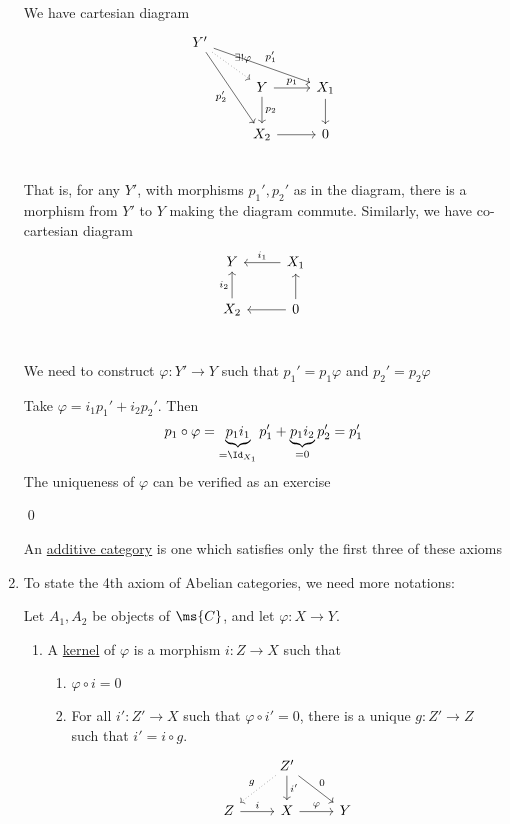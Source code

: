 \documentclass[x11names,reqno,14pt]{extarticle}
\begin{document}
\begin{enumerate}
\lem
 We have cartesian diagram 
\[
\begin{tikzcd}
Y'\ar[dr, dotted, "\exists!\varphi"]\ar[drr, "p_1'"]\ar[ddr, "p_2'"'] &  &  \\
& Y \ar[r, "p_1"] \ar[d, "p_2"] & X_1 \ar[d] \\
& X_2 \ar[r] & 0  \\
\end{tikzcd}
\]
That is, for any $Y'$, with morphisms $p_1', p_2'$ as in the diagram, there is a morphism from $Y'$ to $Y$ making the diagram commute. Similarly, we have co-cartesian diagram
\[
\begin{tikzcd}
Y & \ar[l, "i_1"'] X_1 \\
X_2 \ar[u, "i_2"] & 0 \ar[l] \ar[u] \\
\end{tikzcd}
\]

\proof 

We need to construct $\varphi:Y'\to Y$ such that $p_1' = p_1\varphi$ and $p_2'=p_2\varphi$

Take $\varphi = i_1p_1' + i_2p_2'$. Then 
\[
p_1\circ\varphi = \underbrace{p_1i_1}_{=\Id_{X_1}}p_1' + \underbrace{p_1i_2}_{=0}p_2' = p_1'
\]
The uniqueness of $\varphi$ can be verified as an exercise

\qed


An \underline{additive category} is one which satisfies only the first three of these axioms

\item To state the 4th axiom of Abelian categories, we need more notations:

 Let $A_1,A_2$ be objects of $\ms{C}$, and let $\varphi:X\to Y$.

\begin{enumerate}
\item A \underline{kernel} of $\varphi$ is a morphism $i:Z\to X$ such that 
\begin{enumerate}[label=(\alph*)]

\item $\varphi\circ i = 0$

\item For all $i':Z'\to X$ such that $\varphi\circ i' = 0$, there is a unique $g:Z'\to Z$ such that $i'=i\circ g$. 
\[
\begin{tikzcd}
 & Z' \ar[d, "i'"] \ar[dr, "0"] \ar[dl, dotted, "g"'] & \\
Z \ar[r, "i"] & X \ar[r, "\varphi"] & Y \\
\end{tikzcd}
\]


\end{enumerate}
\end{enumerate}
\end{enumerate}
\end{document}
